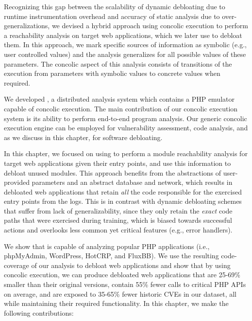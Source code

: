 Recognizing this gap between the scalability of dynamic debloating due to runtime instrumentation overhead and accuracy of static analysis due to over-generalizations, we devised a hybrid approach using concolic execution to perform a reachability analysis on target web applications, which we later use to debloat them. 
In this approach, we mark specific sources of information as symbolic (e.g., user controlled values) and the analysis generalizes for all possible values of these parameters. 
The concolic aspect of this analysis consists of transitions of the execution from parameters with symbolic values to concrete values when required. 

We developed \animatedead{}, a distributed analysis system which contains a PHP emulator capable of concolic execution. 
The main contribution of our concolic execution system is its ability to perform end-to-end program analysis. 
Our generic concolic execution engine can be employed for vulnerability assessment, code analysis, and as we discuss in this chapter, for software debloating. 

In this chapter, we focused on using \animatedead{} to perform a module reachability analysis for target web applications given their entry points, and use this information to debloat unused modules. 
This approach benefits from the abstractions of user-provided parameters and an abstract database and network, which results in debloated web applications that retain \emph{all} the code responsible for the exercised entry points from the logs. 
This is in contrast with dynamic debloating schemes that suffer from lack of generalizability, since they only retain the \emph{exact} code paths that were exercised during training, which is biased towards successful actions and overlooks less common yet critical features (e.g., error handlers). 

We show that \animatedead{} is capable of analyzing popular PHP applications (i.e., phpMyAdmin, WordPress, HotCRP, and FluxBB). 
We use the resulting code-coverage of our analysis to debloat web applications and show that by using concolic execution, we can produce debloated web applications that are 25-69\% smaller than their original versions, contain 55\% fewer calls to critical PHP APIs on average, and are exposed to 35-65\% fewer historic CVEs in our dataset, all while maintaining their required functionality. 
In this chapter, we make the following contributions:

